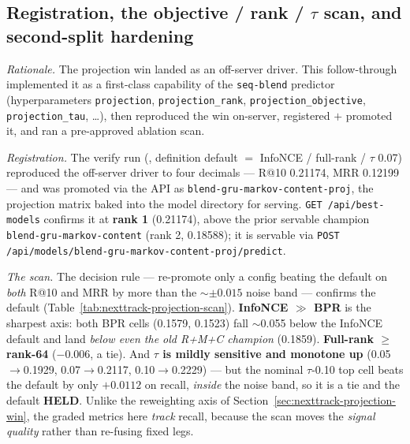 \documentclass[11pt]{article}
\newcommand{\runid}[1]{\texttt{\small\seqsplit{#1}}}
\begin{document}
\subsection{Registration, the objective / rank / $\tau$ scan, and second-split hardening}
\label{sec:nexttrack-projection-scan}
\emph{Rationale.} The projection win landed as an off-server driver. This
follow-through implemented it as a first-class capability of the \texttt{seq-blend}
predictor (hyperparameters \texttt{projection}, \texttt{projection\_rank},
\texttt{projection\_objective}, \texttt{projection\_tau}, \dots), then reproduced
the win on-server, registered $+$ promoted it, and ran a pre-approved ablation scan.

\emph{Registration.} The verify run
(\runid{run-20260718-191539-1b89c-seq-blend}, definition default $=$ InfoNCE /
full-rank / $\tau$ \num{0.07}) reproduced the off-server driver to four decimals ---
R@10 \num{0.21174}, MRR \num{0.12199} --- and was promoted via the API as
\texttt{blend-gru-markov-content-proj}, the projection matrix baked into the model
directory for serving. \texttt{GET /api/best-models} confirms it at \textbf{rank
1} (\num{0.21174}), above the prior servable champion
\texttt{blend-gru-markov-content} (rank 2, \num{0.18588}); it is servable via
\texttt{POST /api/models/blend-gru-markov-content-proj/predict}.

\emph{The scan.} The decision rule --- re-promote only a config beating the default
on \emph{both} R@10 and MRR by more than the $\sim$$\pm\num{0.015}$ noise band ---
confirms the default (Table~\ref{tab:nexttrack-projection-scan}). \textbf{InfoNCE
$\gg$ BPR} is the sharpest axis: both BPR cells (\num{0.1579}, \num{0.1523}) fall
$\sim$\num{0.055} below the InfoNCE default and land \emph{below even the old R+M+C
champion} (\num{0.1859}). \textbf{Full-rank $\ge$ rank-64} ($-\num{0.006}$, a tie).
And \textbf{$\tau$ is mildly sensitive and monotone up} (\num{0.05}$\to$\num{0.1929},
\num{0.07}$\to$\num{0.2117}, \num{0.10}$\to$\num{0.2229}) --- but the nominal
$\tau$-\num{0.10} top cell beats the default by only $+\num{0.0112}$ on recall,
\emph{inside} the noise band, so it is a tie and the default \textbf{HELD}. Unlike
the reweighting axis of Section~\ref{sec:nexttrack-projection-win}, the graded
metrics here \emph{track} recall, because the scan moves the \emph{signal quality}
rather than re-fusing fixed legs.
\end{document}
